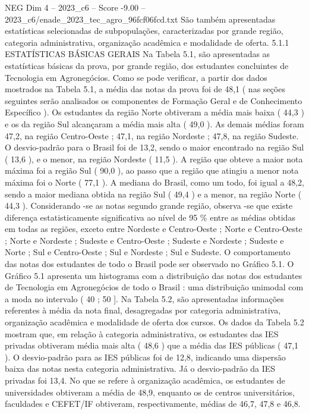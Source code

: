 \begin{textsample}{NEG Dim 4 – 2023\_c6 – Score -9.00 – 2023\_c6/enade\_2023\_tec\_agro\_96fcf06fcd.txt}
São também apresentadas estatísticas selecionadas de subpopulações, caracterizadas por grande região, categoria administrativa, organização acadêmica e modalidade de oferta. 5.1.1 ESTATÍSTICAS BÁSICAS GERAIS Na Tabela 5.1, são apresentadas as estatísticas básicas da prova, por grande região, dos estudantes concluintes de Tecnologia em Agronegócios.
Como se pode verificar, a partir dos dados mostrados na Tabela 5.1, a média das notas da prova foi de 48,1 ( nas seções seguintes serão analisados os componentes de Formação Geral e de Conhecimento Específico ).
Os estudantes da região Norte obtiveram a média mais baixa ( 44,3 ) e os da região Sul alcançaram a média mais alta ( 49,0 ).
As demais médias foram 47,2, na região Centro-Oeste ; 47,1, na região Nordeste ; 47,8, na região Sudeste.
O desvio-padrão para o Brasil foi de 13,2, sendo o maior encontrado na região Sul ( 13,6 ), e o menor, na região Nordeste ( 11,5 ).
A região que obteve a maior nota máxima foi a região Sul ( 90,0 ), ao passo que a região que atingiu a menor nota máxima foi o Norte ( 77,1 ).
A mediana do Brasil, como um todo, foi igual a 48,2, sendo a maior mediana obtida na região Sul ( 49,4 ) e a menor, na região Norte ( 44,3 ).
Considerando -se as notas segundo grande região, observa -se que existe diferença estatisticamente significativa ao nível de 95 \% entre as médias obtidas em todas as regiões, exceto entre Nordeste e Centro-Oeste ; Norte e Centro-Oeste ; Norte e Nordeste ; Sudeste e Centro-Oeste ; Sudeste e Nordeste ; Sudeste e Norte ; Sul e Centro-Oeste ; Sul e Nordeste ; Sul e Sudeste.
O comportamento das notas dos estudantes de todo o Brasil pode ser observado no Gráfico 5.1.
O Gráfico 5.1 apresenta um histograma com a distribuição das notas dos estudantes de Tecnologia em Agronegócios de todo o Brasil : uma distribuição unimodal com a moda no intervalo ( 40 ; 50 ].
Na Tabela 5.2, são apresentadas informações referentes à média da nota final, desagregadas por categoria administrativa, organização acadêmica e modalidade de oferta dos cursos.
Os dados da Tabela 5.2 mostram que, em relação à categoria administrativa, os estudantes das IES privadas obtiveram média mais alta ( 48,6 ) que a média das IES públicas ( 47,1 ).
O desvio-padrão para as IES públicas foi de 12,8, indicando uma dispersão baixa das notas nesta categoria administrativa.
Já o desvio-padrão da IES privadas foi 13,4.
No que se refere à organização acadêmica, os estudantes de universidades obtiveram a média de 48,9, enquanto os de centros universitários, faculdades e CEFET/IF obtiveram, respectivamente, médias de 46,7, 47,8 e 46,8.

\end{textsample}
